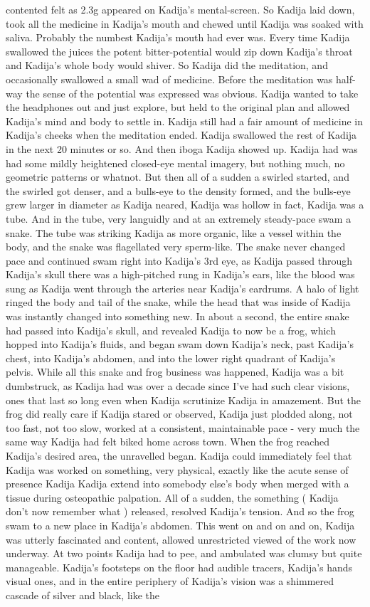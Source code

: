 \documentclass[12pt]{book}
\begin{document}
contented felt as 2.3g appeared on Kadija's mental-screen. So Kadija laid down, took all the medicine in Kadija's mouth and chewed until Kadija was soaked with saliva. Probably the numbest Kadija's mouth had ever was. Every time Kadija swallowed the juices the potent bitter-potential would zip down Kadija's throat and Kadija's whole body would shiver. So Kadija did the meditation, and occasionally swallowed a small wad of medicine. Before the meditation was half-way the sense of the potential was expressed was obvious. Kadija wanted to take the headphones out and just explore, but held to the original plan and allowed Kadija's mind and body to settle in. Kadija still had a fair amount of medicine in Kadija's cheeks when the meditation ended. Kadija swallowed the rest of Kadija in the next 20 minutes or so. And then iboga Kadija showed up. Kadija had was had some mildly heightened closed-eye mental imagery, but nothing much, no geometric patterns or whatnot. But then all of a sudden a swirled started, and the swirled got denser, and a bulls-eye to the density formed, and the bulls-eye grew larger in diameter as Kadija neared, Kadija was hollow in fact, Kadija was a tube. And in the tube, very languidly and at an extremely steady-pace swam a snake. The tube was striking Kadija as more organic, like a vessel within the body, and the snake was flagellated very sperm-like. The snake never changed pace and continued swam right into Kadija's 3rd eye, as Kadija passed through Kadija's skull there was a high-pitched rung in Kadija's ears, like the blood was sung as Kadija went through the arteries near Kadija's eardrums. A halo of light ringed the body and tail of the snake, while the head that was inside of Kadija was instantly changed into something new. In about a second, the entire snake had passed into Kadija's skull, and revealed Kadija to now be a frog, which hopped into Kadija's fluids, and began swam down Kadija's neck, past Kadija's chest, into Kadija's abdomen, and into the lower right quadrant of Kadija's pelvis. While all this snake and frog business was happened, Kadija was a bit dumbstruck, as Kadija had was over a decade since I've had such clear visions, ones that last so long even when Kadija scrutinize Kadija in amazement. But the frog did really care if Kadija stared or observed, Kadija just plodded along, not too fast, not too slow, worked at a consistent, maintainable pace - very much the same way Kadija had felt biked home across town. When the frog reached Kadija's desired area, the unravelled began. Kadija could immediately feel that Kadija was worked on something, very physical, exactly like the acute sense of presence Kadija Kadija extend into somebody else's body when merged with a tissue during osteopathic palpation. All of a sudden, the something ( Kadija don't now remember what ) released, resolved Kadija's tension. And so the frog swam to a new place in Kadija's abdomen. This went on and on and on, Kadija was utterly fascinated and content, allowed unrestricted viewed of the work now underway. At two points Kadija had to pee, and ambulated was clumsy but quite manageable. Kadija's footsteps on the floor had audible tracers, Kadija's hands visual ones, and in the entire periphery of Kadija's vision was a shimmered cascade of silver and black, like the 
\end{document}

